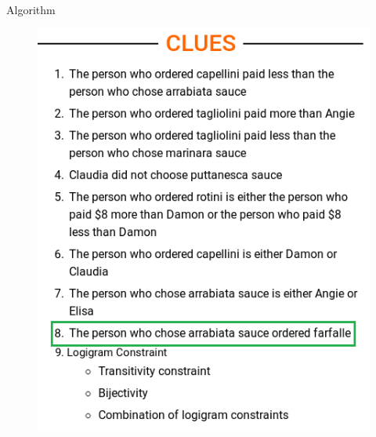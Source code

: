 \documentclass[handout]{beamer}
\begin{document}
\begin{frame}{Algorithm}
{\begin{minipage}[t]{0.40\textwidth}
\begin{figure}[h]
                \includegraphics[width=\textwidth]{figures/clues}
                \label{clues}
            \end{figure}

        \end{minipage}

}
\end{frame}
\end{document}
